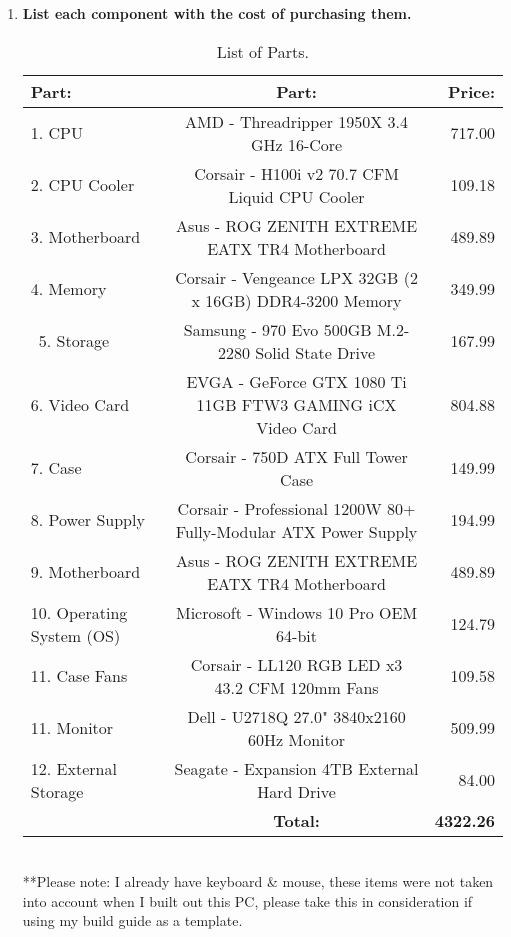 \documentclass[]{article}
\begin{document}
\begin{enumerate}
\begin{enumerate}
			\item \textbf{List each component with the cost of purchasing them.}
			\smallskip
			
			\begin{table}[h!]
				\begin{center}
					\caption{List of Parts.}
					\label{tab:table1}
					\begin{tabular}{l|c|r} %
						\textbf{Part:} & \textbf{Part:} & \textbf{Price:}\\
						\hline
						1. CPU & AMD - Threadripper 1950X 3.4 GHz 16-Core & 717.00\\
						2. CPU Cooler & Corsair - H100i v2 70.7 CFM Liquid CPU Cooler  & 109.18\\
						3. Motherboard & Asus - ROG ZENITH EXTREME EATX TR4 Motherboard & 489.89\\
						4. Memory & Corsair - Vengeance LPX 32GB (2 x 16GB) DDR4-3200 Memory & 349.99\\\
						5. Storage & Samsung - 970 Evo 500GB M.2-2280 Solid State Drive & 167.99\\
						6. Video Card &EVGA - GeForce GTX 1080 Ti 11GB FTW3 GAMING iCX Video Card & 804.88\\
						7. Case & Corsair - 750D ATX Full Tower Case & 149.99\\
						8. Power Supply & Corsair - Professional 1200W 80+ Fully-Modular ATX Power Supply & 194.99\\
						9. Motherboard & Asus - ROG ZENITH EXTREME EATX TR4 Motherboard & 489.89\\
						10. Operating System (OS) & Microsoft - Windows 10 Pro OEM 64-bit & 124.79\\
						11. Case Fans & Corsair - LL120 RGB LED x3 43.2 CFM 120mm Fans & 109.58\\
						11. Monitor & Dell - U2718Q 27.0" 3840x2160 60Hz Monitor & 509.99\\
						12. External Storage & Seagate - Expansion 4TB External Hard Drive & 84.00\\
						\hline
						& \textbf{Total:} & \textbf{4322.26}\\
						
						
						
					\end{tabular}
					\medskip
					\\**Please note: I already have keyboard \& mouse, these items were not taken into account when I built out this PC,  please take this in consideration if using my build guide as a template.
				\end{center}
			\end{table}
			

\end{enumerate}
\end{enumerate}
\end{document}
